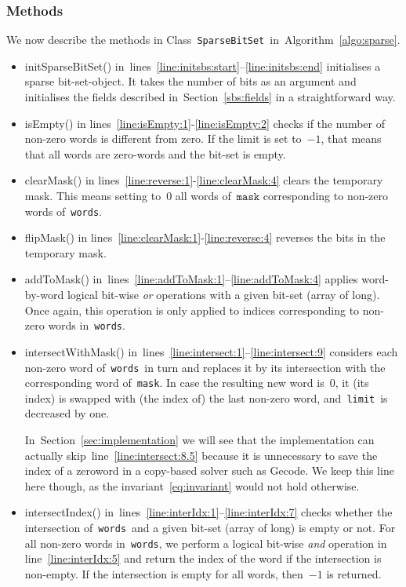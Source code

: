 \documentclass[a4paper,11pt]{article}
\newcommand{\Secref}[1]{Section~\ref{#1}}
\newcommand{\Algoref}[1]{Algorithm~\ref{#1}}
\newcommand{\lineref}[1]{line~\ref{#1}}
\newcommand{\linesref}[2]{lines~\ref{#1}--\ref{#2}}
\newcommand{\Eqref}[1]{\eqref{#1}}
\newcommand{\Words}{\texttt{words}}
\newcommand{\Mask}{\texttt{mask}}
\newcommand{\Limit}{\texttt{limit}}
\newcommand{\SparseBitSet}{\texttt{SparseBitSet}}
\numberwithin{equation}{section}
\begin{document}
\subsubsection{Methods}
We now describe the methods in Class~\SparseBitSet~in~\Algoref{algo:sparse}.

\begin{itemize}
  \item initSparseBitSet() in~\linesref{line:initsbs:start}{line:initsbs:end}
    initialises a sparse bit-set-object. It takes 
    the number of bits as an argument and initialises the fields
    described in~\Secref{sbs:fields} in a straightforward way.

  \item isEmpty() in lines~\ref{line:isEmpty:1}-\ref{line:isEmpty:2} checks
    if the number of non-zero words is different from zero. If the limit is
    set to~$-1$, that means that all words are zero-words and the bit-set
    is empty.

  \item clearMask() in lines~\ref{line:reverse:1}-\ref{line:clearMask:4}
    clears the temporary mask. This means setting to~$0$ all words of~$\Mask$
    corresponding to non-zero words of~\Words.
    
  \item flipMask() in lines~\ref{line:clearMask:1}-\ref{line:reverse:4}
    reverses the bits in the temporary mask.
  
  \item addToMask() in~\linesref{line:addToMask:1}{line:addToMask:4} applies
    word-by-word logical bit-wise
    \emph{or} operations with a given bit-set (array of long).
    Once again, this operation is only applied to indices corresponding to
    non-zero words in~\Words.

  \item intersectWithMask() in~\linesref{line:intersect:1}{line:intersect:9}
    considers each non-zero word of~\Words~in turn
    and replaces it by its intersection with the corresponding word of~\Mask.
    In case the resulting new word is~$0$, it (its index) is swapped with
    (the index of) the last non-zero word, and~\Limit~is
    decreased by one.
    
    In~\Secref{sec:implementation} we will see that the implementation
    can actually skip~\lineref{line:intersect:8.5} because it is unnecessary
    to save the index of a zeroword in a copy-based solver such as Gecode.
    We keep this
    line here though, as the invariant~\Eqref{eq:invariant} 
    would not hold otherwise.
    
  \item intersectIndex() in~\linesref{line:interIdx:1}{line:interIdx:7}
    checks whether the intersection of~\Words~and a given bit-set
    (array of long) is empty or not. For all non-zero words in~\Words,
    we perform a logical bit-wise \emph{and} operation 
    in line~\ref{line:interIdx:5} and return
    the index of the word if the intersection is non-empty. If the
    intersection is empty for all words, then~$-1$ is returned.
\end{itemize}
\end{document}
